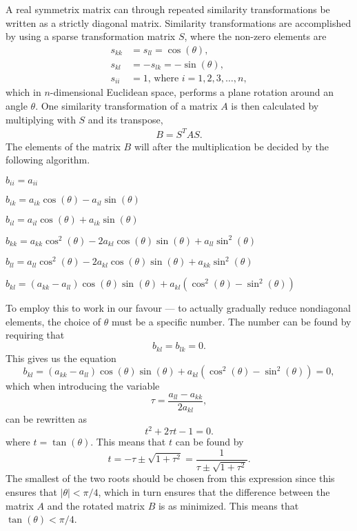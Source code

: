 A real symmetrix matrix can through repeated similarity
transformations be written as a strictly diagonal matrix.
Similarity transformations are accomplished by using a sparse
transformation matrix $S$, where the non-zero elements are
\begin{align*}
    s_{kk} &= s_{ll} = \cos{(\theta)}, \\
    s_{kl} &= -s_{lk} = -\sin{(\theta)}, \\
    s_{ii} &= 1 \text{, where } i = 1,2,3,\dots,n,
\end{align*}
which in $n$-dimensional Euclidean space, performs a plane rotation
around an angle $\theta$. One similarity transformation of a matrix
$A$ is then calculated by multiplying with $S$ and its transpose,
\begin{align*}
    B = S^T A S.
\end{align*}
The elements of the matrix $B$ will after the multiplication be
decided by the following algorithm.
\begin{algorithmic}
        \State$b_{ii} = a_{ii}$

        \State $b_{ik} = a_{ik}\cos{(\theta)} - a_{il}\sin{(\theta)}$

        \State $b_{il} = a_{il}\cos{(\theta)} + a_{ik}\sin{(\theta)}$

        \State $b_{kk} = a_{kk}\cos^2{(\theta)} -
        2a_{kl}\cos{(\theta)}\sin{(\theta)} +
        a_{ll}\sin^2{(\theta)}$

        \State $b_{ll} = a_{ll}\cos^2{(\theta)} -
        2a_{kl}\cos{(\theta)}\sin{(\theta)} +
        a_{kk}\sin^2{(\theta)}$
        
        \State $b_{kl} =
        (a_{kk}-a_{ll})\cos{(\theta)}\sin{(\theta)} +
        a_{kl}(\cos^2{(\theta)} - \sin^2{(\theta)})$
    \EndFor
\end{algorithmic}
To employ this to work in our favour --- to actually gradually
reduce nondiagonal elements, the choice of $\theta$ must be a
specific number. The number can be found by requiring that \[b_{kl}
= b_{lk} = 0.\] This gives us the equation \[b_{kl} = (a_{kk} -
a_{ll})\cos{(\theta)}\sin{(\theta)} + a_{kl}(\cos^2{(\theta)} -
\sin^2{(\theta)}) = 0,\] which when introducing the variable \[\tau
= \frac{a_{ll}-a_{kk}}{2a_{kl}},\] can be rewritten as \[t^2 +
2\tau t - 1 = 0.\] where $t = \tan{(\theta)}$. This means that
$t$ can be found by \[t = -\tau \pm \sqrt{1 + \tau^2} =
\frac{1}{\tau \pm \sqrt{1 + \tau^2}}.\] The smallest of the two
roots should be chosen from this expression since this ensures that
$|\theta| < \pi / 4$, which in turn ensures that the
difference between the matrix $A$ and the rotated matrix $B$ is as
minimized. This means that $\tan{(\theta)} < \pi / 4$.


